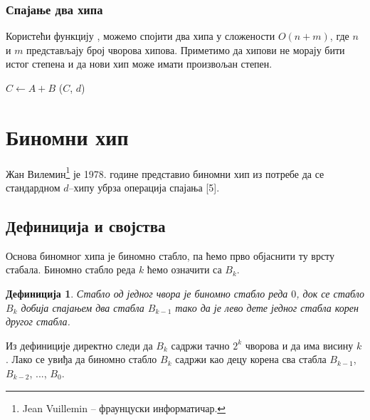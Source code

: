 \documentclass[11pt, a4paper]{article}
\newtheorem{definicija}{\selectlanguage{russian} Дефиниција} [subsection]
\theoremstyle{remark}
\numberwithin{equation}{section}
\begin{document}
	\bigbreak

	\subsubsection{Спајање два хипа}
	Користећи функцију , можемо спојити два хипа у сложености $O(n+m)$, где $n$ и $m$ представљају број чворова хипова. Приметимо да хипови не морају бити истог степена и да нови хип може имати произвољан степен.

	\begin{codebox}
		\li $C \gets A+B$
		\li {}($C$, $d$)
	\end{codebox}

	\newpage
	
	\section{Биномни хип}
	Жан Вилемин\footnote{Jean Vuillemin -- фраунцуски информатичар.} је 1978. године представио биномни хип из потребе да се стандардном $d$--хипу убрза операција спајања [5].
	
	\subsection{Дефиниција и својства}
	Основа биномног хипа је биномно стабло, па ћемо прво објаснити ту врсту стабала. Биномно стабло реда $k$ ћемо означити са $B_k$.
	\begin{definicija}
		\normalfont
		Стабло од једног чвора је биномно стабло реда $0$, док се стабло $B_k$ добија спајањем два стабла $B_{k-1}$ тако да је лево дете једног стабла корен другог стабла.
	\end{definicija}

	\indent Из дефиниције директно следи да $B_k$ садржи тачно $2^k$ чворова и да има висину $k$. Лако се увиђа да биномно стабло $B_k$ садржи као децу корена сва стабла $B_{k-1}$, $B_{k-2}$, ..., $B_0$. \\
	
\end{document}
